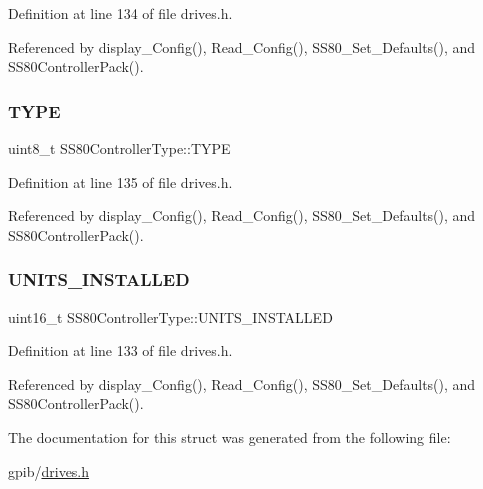 Definition at line 134 of file drives.\+h.



Referenced by display\+\_\+\+Config(), Read\+\_\+\+Config(), S\+S80\+\_\+\+Set\+\_\+\+Defaults(), and S\+S80\+Controller\+Pack().

\mbox{\label{structSS80ControllerType_a255739680bca0ad3b4d1346cf5017332}} 
\subsubsection{\texorpdfstring{T\+Y\+PE}{TYPE}}
{\footnotesize\ttfamily uint8\+\_\+t S\+S80\+Controller\+Type\+::\+T\+Y\+PE}



Definition at line 135 of file drives.\+h.



Referenced by display\+\_\+\+Config(), Read\+\_\+\+Config(), S\+S80\+\_\+\+Set\+\_\+\+Defaults(), and S\+S80\+Controller\+Pack().

\mbox{\label{structSS80ControllerType_a0868c32b362ef2af2ac64fa16aee8aae}} 
\subsubsection{\texorpdfstring{U\+N\+I\+T\+S\+\_\+\+I\+N\+S\+T\+A\+L\+L\+ED}{UNITS\_INSTALLED}}
{\footnotesize\ttfamily uint16\+\_\+t S\+S80\+Controller\+Type\+::\+U\+N\+I\+T\+S\+\_\+\+I\+N\+S\+T\+A\+L\+L\+ED}



Definition at line 133 of file drives.\+h.



Referenced by display\+\_\+\+Config(), Read\+\_\+\+Config(), S\+S80\+\_\+\+Set\+\_\+\+Defaults(), and S\+S80\+Controller\+Pack().



The documentation for this struct was generated from the following file\+:\begin{DoxyCompactItemize}
\item 
gpib/\hyperlink{drives_8h}{drives.\+h}\end{DoxyCompactItemize}
